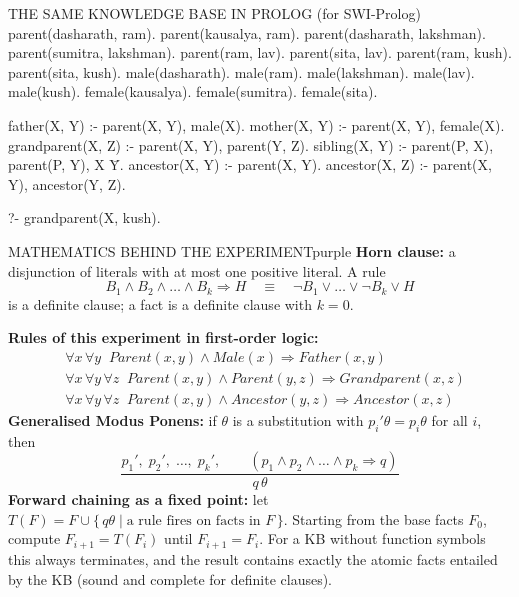 \documentclass[11pt,a4paper]{article}
\newenvironment{maths}{\begin{secbox}{MATHEMATICS BEHIND THE EXPERIMENT}{purple}}{\end{secbox}}
\begin{document}
\begin{plaincode}{THE SAME KNOWLEDGE BASE IN PROLOG (for SWI-Prolog)}
parent(dasharath, ram).   parent(kausalya, ram).
parent(dasharath, lakshman).   parent(sumitra, lakshman).
parent(ram, lav).  parent(sita, lav).  parent(ram, kush).  parent(sita, kush).
male(dasharath). male(ram). male(lakshman). male(lav). male(kush).
female(kausalya). female(sumitra). female(sita).

father(X, Y)      :- parent(X, Y), male(X).
mother(X, Y)      :- parent(X, Y), female(X).
grandparent(X, Z) :- parent(X, Y), parent(Y, Z).
sibling(X, Y)     :- parent(P, X), parent(P, Y), X \= Y.
ancestor(X, Y)    :- parent(X, Y).
ancestor(X, Z)    :- parent(X, Y), ancestor(Y, Z).

?- grandparent(X, kush).
\end{plaincode}

\begin{maths}
\textbf{Horn clause:} a disjunction of literals with at most one positive literal. A rule
\[ B_1 \land B_2 \land \dots \land B_k \Rightarrow H \quad\equiv\quad \lnot B_1 \lor \dots \lor \lnot B_k \lor H \]
is a definite clause; a fact is a definite clause with $k=0$.

\textbf{Rules of this experiment in first-order logic:}
\begin{align*}
&\forall x\,\forall y\;\; \mathit{Parent}(x,y)\land \mathit{Male}(x) \Rightarrow \mathit{Father}(x,y)\\
&\forall x\,\forall y\,\forall z\;\; \mathit{Parent}(x,y)\land \mathit{Parent}(y,z) \Rightarrow \mathit{Grandparent}(x,z)\\
&\forall x\,\forall y\,\forall z\;\; \mathit{Parent}(x,y)\land \mathit{Ancestor}(y,z) \Rightarrow \mathit{Ancestor}(x,z)
\end{align*}
\textbf{Generalised Modus Ponens:} if $\theta$ is a substitution with $p_i'\theta = p_i\theta$ for all $i$, then
\[ \frac{p_1',\; p_2',\;\dots,\; p_k',\qquad (p_1\land p_2\land\dots\land p_k \Rightarrow q)}{q\,\theta} \]
\textbf{Forward chaining as a fixed point:} let $T(F)= F \cup \{\,q\theta \mid \text{a rule fires on facts in } F\,\}$. Starting from the base facts $F_0$, compute $F_{i+1}=T(F_i)$ until $F_{i+1}=F_i$. For a KB without function symbols this always terminates, and the result contains exactly the atomic facts entailed by the KB (sound and complete for definite clauses).
\end{maths}
\end{document}
